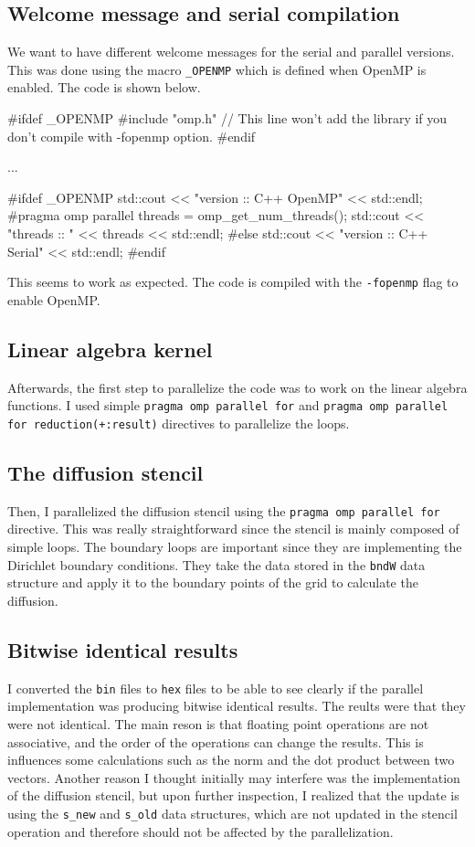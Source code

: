 \documentclass[unicode,11pt,a4paper,oneside,numbers=endperiod,openany]{scrartcl}
\begin{document}
\subsection*{Welcome message and serial compilation}
We want to have different welcome messages for the serial and parallel versions.
This was done using the macro \texttt{\_OPENMP} which is defined when OpenMP is
enabled. The code is shown below.
\begin{cppverbatim}
#ifdef _OPENMP
#include "omp.h" // This line won't add the library if you don't compile with -fopenmp option.
#endif

...

#ifdef _OPENMP
    std::cout << "version   :: C++ OpenMP" << std::endl;
#pragma omp parallel
    {
        threads = omp_get_num_threads();
    }
    std::cout << "threads   :: " << threads << std::endl;
#else
    std::cout << "version   :: C++ Serial" << std::endl;
#endif
\end{cppverbatim}    
This seems to work as expected. The code is compiled with the \texttt{-fopenmp}
flag to enable OpenMP.

\subsection*{Linear algebra kernel}
Afterwards, the first step to parallelize the code was to work on the linear
algebra functions. I used simple \texttt{pragma omp
parallel for}  and 
\texttt{pragma omp parallel for reduction(+:result)} directives to parallelize the loops.

\subsection*{The diffusion stencil}
Then, I parallelized the diffusion stencil using the \texttt{pragma omp
parallel for} directive. This was really straightforward since the stencil is
mainly composed of simple loops.
The boundary loops are important since they are implementing the Dirichlet
boundary conditions. They take the data stored in the \texttt{bndW} data
structure and apply it to the boundary points of the grid to calculate the
diffusion. 


\subsection*{Bitwise identical results}\label{sec:bitwise}
I converted the \texttt{bin} files to \texttt{hex} files to be able to see clearly if the parallel
implementation was producing bitwise identical results. The reults were that they
were not identical. The main reson is that floating
point operations are not associative, and the order of the operations can change
the results. This is influences some calculations such as the norm and the dot product
between two vectors. 
Another reason I thought initially may interfere was the implementation of the diffusion
stencil, but upon further inspection, I realized that the update is using the
\texttt{s\_new} and \texttt{s\_old} data structures, which are not updated in the
stencil operation and therefore should not be affected by the parallelization.
\end{document}
